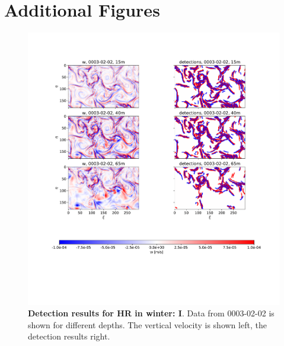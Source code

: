 \chapter{Additional Figures}

\begin{figure}
    \centering
    \includegraphics[width=16cm, trim=2.5cm 0 0 2cm]{figures/eval_det_subm_winter.pdf}
    \caption[Detection results for HR in winter: I]{\textbf{Detection results for HR in winter: I}. Data from 0003-02-02 is shown for different depths. The vertical velocity is shown left, the detection results right.}\label{fig:subm_det_winter}
\end{figure}

